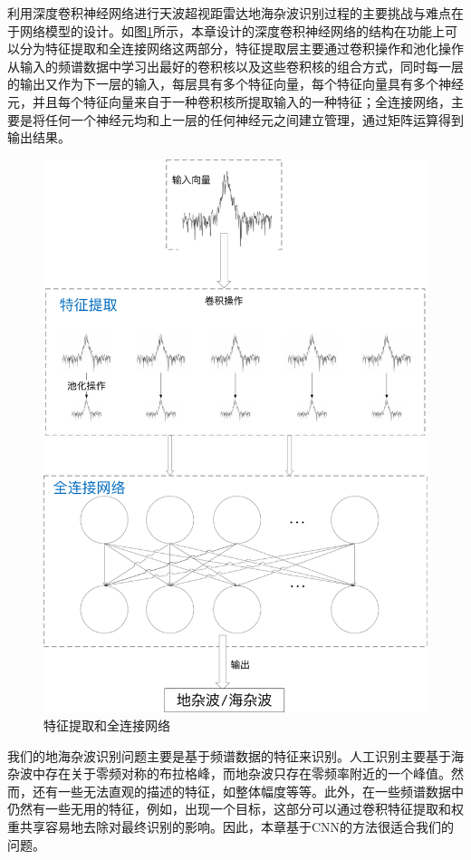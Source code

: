 利用深度卷积神经网络进行天波超视距雷达地海杂波识别过程的主要挑战与难点在于网络模型的设计。如图\ref{fig:fullconnect}所示，本章设计的深度卷积神经网络的结构在功能上可以分为特征提取和全连接网络这两部分，特征提取层主要通过卷积操作和池化操作从输入的频谱数据中学习出最好的卷积核以及这些卷积核的组合方式，同时每一层的输出又作为下一层的输入，每层具有多个特征向量，每个特征向量具有多个神经元，并且每个特征向量来自于一种卷积核所提取输入的一种特征；全连接网络，主要是将任何一个神经元均和上一层的任何神经元之间建立管理，通过矩阵运算得到输出结果。
\begin{figure}[H]
	\centering
	\includegraphics[width=\textwidth]{figures/othr/fullconnect}
	\caption{特征提取和全连接网络}
	\label{fig:fullconnect}
\end{figure}

我们的地海杂波识别问题主要是基于频谱数据的特征来识别。人工识别主要基于海杂波中存在关于零频对称的布拉格峰，而地杂波只存在零频率附近的一个峰值。然而，还有一些无法直观的描述的特征，如整体幅度等等。此外，在一些频谱数据中仍然有一些无用的特征，例如，出现一个目标，这部分可以通过卷积特征提取和权重共享容易地去除对最终识别的影响。因此，本章基于CNN的方法很适合我们的问题。

